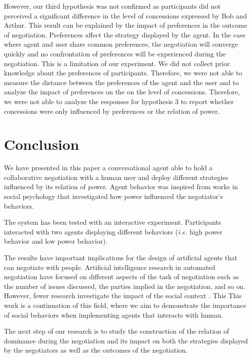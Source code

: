 \documentclass[runningheads,a4paper]{llncs}
\begin{document}
		However, our third hypothesis was not confirmed as participants did not perceived a significant difference in the level of concessions expressed by Bob and Arthur. This result can be explained by the impact of preferences in the outcome of negotiation. Preferences affect the strategy displayed by the agent. In the case where agent and user share common preferences, the negotiation will converge quickly and no confrontation of preferences will be experienced during the negotiation. This is a limitation of our experiment. We did not collect prior knowledge about the preferences of participants. Therefore, we were not able to measure the distance between the preferences of the agent and the user and to analyze the impact of preferences on the on the level of concessions. Therefore, we were not able to analyze the responses for hypothesis 3 to report whether concessions were only influenced by preferences or the relation of power.
		
		\section{Conclusion}
		
		We have presented in this paper a conversational agent able to hold a collaborative negotiation with a human user and deploy different strategies influenced by its relation of power. Agent behavior was inspired from works in social psychology that investigated how power influenced the negotiator's behaviors.
		
		 The system has been tested with an interactive experiment. Participants interacted with two agents displaying different behaviors (\textit{i.e.} high power behavior and low power behavior).
		 
		 The results have important implications for the design of artificial agents that can negotiate with people. Artificial intelligence research in automated negotiation have focused on different aspects of the task of negotiation such as the number of issues discussed, the parties implied in the negotiation, and so on. However, fewer research investigate the impact of the social context \cite{de2011effect,nazari2015opponent}. This This work is a continuation of this field, where we aim to demonstrate the importance of social behaviors when implementing agents that interacts with human. %
		
		The next step of our research is to study the construction of the relation of dominance during the negotiation and its impact on both the strategies displayed by the negotiators as well as the outcomes of the negotiation.
		

\scriptsize{	
	
	}
\end{document}
